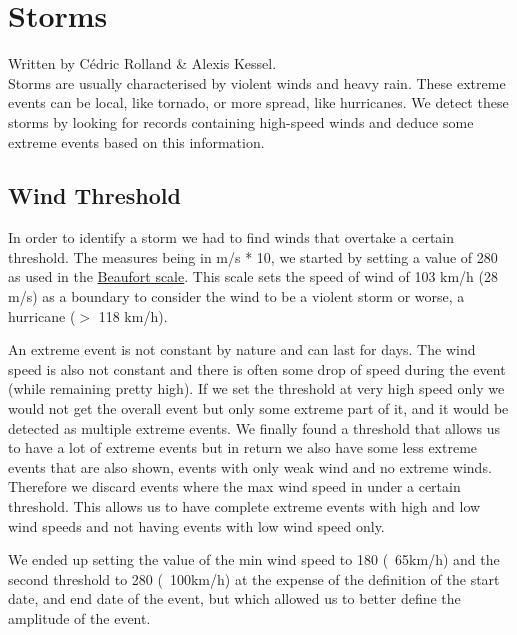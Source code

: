 \section{Storms}
Written by Cédric Rolland \& Alexis Kessel.\\

Storms are usually characterised by violent winds and heavy rain. These extreme events can be local, like tornado, or more spread, like hurricanes. We detect these storms by looking for records containing high-speed winds and deduce some extreme events based on this information.

\subsection{Wind Threshold}
In order to identify a storm we had to find winds that overtake a certain threshold. The measures being in m/s * 10, we started by setting a value of 280 as used in the \href{http://en.wikipedia.org/wiki/Beaufort_scale}{Beaufort scale}. This scale sets the speed of wind of 103 km/h (28 m/s) as a boundary to consider the wind to be a violent storm or worse, a hurricane ($>$ 118 km/h).

An extreme event is not constant by nature and can last for days. The wind speed is also not constant and there is often some drop of speed during the event (while remaining pretty high). If we set the threshold at very high speed only we would not get the overall event but only some extreme part of it, and it would be detected as multiple extreme events. We finally found a threshold that allows us to have a lot of extreme events but in return we also have some less extreme events that are also shown, events with only weak wind and no extreme winds. Therefore we discard events where the max wind speed in under a certain threshold. This allows us to have complete extreme events with high and low wind speeds and not having events with low wind speed only.

We ended up setting the value of the min wind speed to 180 (~65km/h) and the second threshold to 280 (~100km/h) at the expense of the definition of the start date, and end date of the event, but which allowed us to better define the amplitude of the event.


